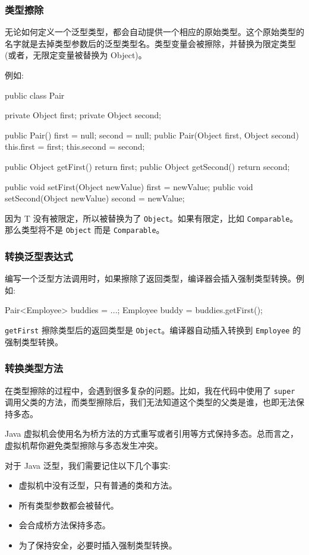 \subsubsection{类型擦除}

无论如何定义一个泛型类型，都会自动提供一个相应的原始类型。这个原始类型的名字就是去掉类型参数后的泛型类型名。类型变量会被擦除，并替换为限定类型(或者，无限定变量被替换为 Object)。

例如:
\begin{Java}
public class Pair {
    private Object first;
    private Object second;

    public Pair() {first = null; second = null;}
    public Pair(Object first, Object second) {this.first = first; this.second = second;}

    public Object getFirst() {return first;}
    public Object getSecond() {return second;}

    public void setFirst(Object newValue) {first = newValue;}
    public void setSecond(Object newValue) {second = newValue;}
}
\end{Java}

因为 T 没有被限定，所以被替换为了 \texttt{Object}。如果有限定，比如 \texttt{Comparable}。那么类型将不是 \texttt{Object} 而是 \texttt{Comparable}。

\subsubsection{转换泛型表达式}

编写一个泛型方法调用时，如果擦除了返回类型，编译器会插入强制类型转换。例如:
\begin{Java}
Pair<Employee> buddies = ...;
Employee buddy = buddies.getFirst();
\end{Java}

\texttt{getFirst} 擦除类型后的返回类型是 \texttt{Object}。编译器自动插入转换到 \texttt{Employee} 的强制类型转换。

\subsubsection{转换类型方法}

在类型擦除的过程中，会遇到很多复杂的问题。比如，我在代码中使用了 \texttt{super} 调用父类的方法，而类型擦除后，我们无法知道这个类型的父类是谁，也即无法保持多态。

Java 虚拟机会使用名为桥方法的方式重写或者引用等方式保持多态。总而言之，虚拟机帮你避免类型擦除与多态发生冲突。

对于 Java 泛型，我们需要记住以下几个事实:
\begin{itemize}
    \item 虚拟机中没有泛型，只有普通的类和方法。
    \item 所有类型参数都会被替代。
    \item 会合成桥方法保持多态。
    \item 为了保持安全，必要时插入强制类型转换。
\end{itemize}

